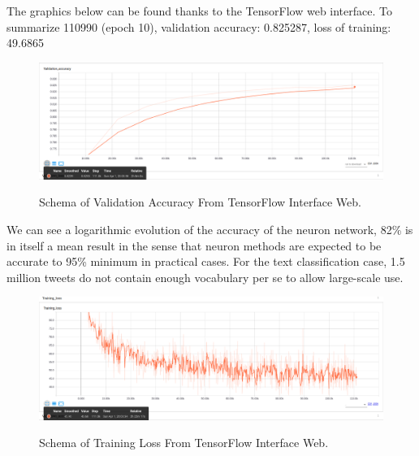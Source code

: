 \documentclass{acmtog} %
\begin{document}
\begin{itemize}
The graphics below can be found thanks to the TensorFlow web interface.
To summarize 110990 (epoch 10), validation accuracy: 0.825287, loss of training: 49.6865

\begin{figure}[H]
{\includegraphics[width=\linewidth]{validation-accuracy.png}}
\caption{Schema of Validation Accuracy From TensorFlow Interface Web.}
  \label{fig:archivedb}
\end{figure}

We can see a logarithmic evolution of the accuracy of the neuron network, 82\% is in itself a mean result in the sense that neuron methods are expected to be accurate to 95\% minimum in practical cases. For the text classification case, 1.5 million tweets do not contain enough vocabulary per se to allow large-scale use.

\begin{figure}[H]
{\includegraphics[width=\linewidth]{training-loss.png}}
\caption{Schema of Training Loss From TensorFlow Interface Web.}
  \label{fig:archivedb}
\end{figure}



\end{itemize}
\end{document}
